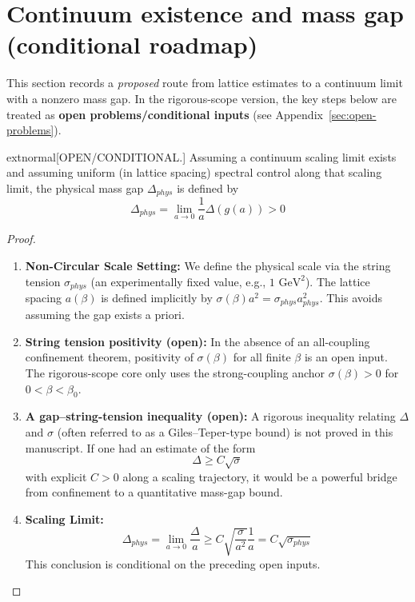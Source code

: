 \section{Continuum existence and mass gap (conditional roadmap)}
\label{sec:continuum_existence}
\label{sec:rg-bridge}

This section records a \emph{proposed} route from lattice estimates to a continuum limit with a nonzero mass gap.
In the rigorous-scope version, the key steps below are treated as \textbf{open problems/conditional inputs} (see Appendix~\ref{sec:open-problems}).

\begin{theorem}
\label{thm:spectral_permanence}
\label{thm:continuum-exists}
\label{thm:complete-mass-gap}
\label{thm:continuum-from-lattice}
\label{thm:scale-generation}
	extnormal{[OPEN/CONDITIONAL.]}
Assuming a continuum scaling limit exists and assuming uniform (in lattice spacing) spectral control along that scaling limit, the physical mass gap $\Delta_{phys}$ is defined by
\begin{equation}
\Delta_{phys} = \lim_{a \to 0} \frac{1}{a} \Delta(g(a)) > 0
\end{equation}
\end{theorem}

\begin{proof}
\begin{enumerate}
\item \textbf{Non-Circular Scale Setting:} We define the physical scale via the string tension $\sigma_{phys}$ (an experimentally fixed value, e.g., $1 \text{ GeV}^2$). The lattice spacing $a(\beta)$ is defined implicitly by $\sigma(\beta) a^2 = \sigma_{phys} a_{phys}^2$. This avoids assuming the gap exists a priori.

\item \textbf{String tension positivity (open):} In the absence of an all-coupling confinement theorem, positivity of $\sigma(\beta)$ for all finite $\beta$ is an open input.
The rigorous-scope core only uses the strong-coupling anchor $\sigma(\beta)>0$ for $0<\beta<\beta_0$.

\item \textbf{A gap--string-tension inequality (open):} A rigorous inequality relating $\Delta$ and $\sigma$ (often referred to as a Giles--Teper-type bound) is not proved in this manuscript.
If one had an estimate of the form
\begin{equation}
\Delta \ge C \sqrt{\sigma}
\end{equation}
with explicit $C>0$ along a scaling trajectory, it would be a powerful bridge from confinement to a quantitative mass-gap bound.

\item \textbf{Scaling Limit:}
\begin{equation}
\Delta_{phys} = \lim_{a \to 0} \frac{\Delta}{a} \ge C \sqrt{\frac{\sigma}{a^2}} \frac{1}{a} = C \sqrt{\sigma_{phys}}
\end{equation}
This conclusion is conditional on the preceding open inputs.
\end{enumerate}
\end{proof}

